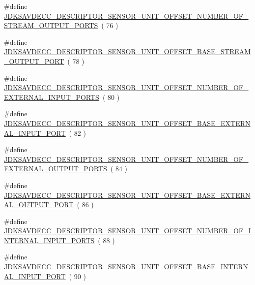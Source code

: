 \begin{DoxyCompactItemize}
\#define \hyperlink{group__descriptor__sensor_gaacec8239123a4fee756ff56fb4636e2d}{J\+D\+K\+S\+A\+V\+D\+E\+C\+C\+\_\+\+D\+E\+S\+C\+R\+I\+P\+T\+O\+R\+\_\+\+S\+E\+N\+S\+O\+R\+\_\+\+U\+N\+I\+T\+\_\+\+O\+F\+F\+S\+E\+T\+\_\+\+N\+U\+M\+B\+E\+R\+\_\+\+O\+F\+\_\+\+S\+T\+R\+E\+A\+M\+\_\+\+O\+U\+T\+P\+U\+T\+\_\+\+P\+O\+R\+TS}~( 76 )
\item 
\#define \hyperlink{group__descriptor__sensor_gafc34a74882819f2fbe133dccaed51878}{J\+D\+K\+S\+A\+V\+D\+E\+C\+C\+\_\+\+D\+E\+S\+C\+R\+I\+P\+T\+O\+R\+\_\+\+S\+E\+N\+S\+O\+R\+\_\+\+U\+N\+I\+T\+\_\+\+O\+F\+F\+S\+E\+T\+\_\+\+B\+A\+S\+E\+\_\+\+S\+T\+R\+E\+A\+M\+\_\+\+O\+U\+T\+P\+U\+T\+\_\+\+P\+O\+RT}~( 78 )
\item 
\#define \hyperlink{group__descriptor__sensor_ga317db7614f7f0baf1e04edda134b29f9}{J\+D\+K\+S\+A\+V\+D\+E\+C\+C\+\_\+\+D\+E\+S\+C\+R\+I\+P\+T\+O\+R\+\_\+\+S\+E\+N\+S\+O\+R\+\_\+\+U\+N\+I\+T\+\_\+\+O\+F\+F\+S\+E\+T\+\_\+\+N\+U\+M\+B\+E\+R\+\_\+\+O\+F\+\_\+\+E\+X\+T\+E\+R\+N\+A\+L\+\_\+\+I\+N\+P\+U\+T\+\_\+\+P\+O\+R\+TS}~( 80 )
\item 
\#define \hyperlink{group__descriptor__sensor_ga5754b8ba6c3243191fd82da170a3ebc7}{J\+D\+K\+S\+A\+V\+D\+E\+C\+C\+\_\+\+D\+E\+S\+C\+R\+I\+P\+T\+O\+R\+\_\+\+S\+E\+N\+S\+O\+R\+\_\+\+U\+N\+I\+T\+\_\+\+O\+F\+F\+S\+E\+T\+\_\+\+B\+A\+S\+E\+\_\+\+E\+X\+T\+E\+R\+N\+A\+L\+\_\+\+I\+N\+P\+U\+T\+\_\+\+P\+O\+RT}~( 82 )
\item 
\#define \hyperlink{group__descriptor__sensor_ga766142ff559ef4178d5bdfd6884bf49b}{J\+D\+K\+S\+A\+V\+D\+E\+C\+C\+\_\+\+D\+E\+S\+C\+R\+I\+P\+T\+O\+R\+\_\+\+S\+E\+N\+S\+O\+R\+\_\+\+U\+N\+I\+T\+\_\+\+O\+F\+F\+S\+E\+T\+\_\+\+N\+U\+M\+B\+E\+R\+\_\+\+O\+F\+\_\+\+E\+X\+T\+E\+R\+N\+A\+L\+\_\+\+O\+U\+T\+P\+U\+T\+\_\+\+P\+O\+R\+TS}~( 84 )
\item 
\#define \hyperlink{group__descriptor__sensor_ga32908171bc53dd4069aa60d873aa6f21}{J\+D\+K\+S\+A\+V\+D\+E\+C\+C\+\_\+\+D\+E\+S\+C\+R\+I\+P\+T\+O\+R\+\_\+\+S\+E\+N\+S\+O\+R\+\_\+\+U\+N\+I\+T\+\_\+\+O\+F\+F\+S\+E\+T\+\_\+\+B\+A\+S\+E\+\_\+\+E\+X\+T\+E\+R\+N\+A\+L\+\_\+\+O\+U\+T\+P\+U\+T\+\_\+\+P\+O\+RT}~( 86 )
\item 
\#define \hyperlink{group__descriptor__sensor_ga924bc1c8943c8cee82bef5c6ffde5929}{J\+D\+K\+S\+A\+V\+D\+E\+C\+C\+\_\+\+D\+E\+S\+C\+R\+I\+P\+T\+O\+R\+\_\+\+S\+E\+N\+S\+O\+R\+\_\+\+U\+N\+I\+T\+\_\+\+O\+F\+F\+S\+E\+T\+\_\+\+N\+U\+M\+B\+E\+R\+\_\+\+O\+F\+\_\+\+I\+N\+T\+E\+R\+N\+A\+L\+\_\+\+I\+N\+P\+U\+T\+\_\+\+P\+O\+R\+TS}~( 88 )
\item 
\#define \hyperlink{group__descriptor__sensor_ga4c46df3b11a0dfd2b3be567d1504f9f7}{J\+D\+K\+S\+A\+V\+D\+E\+C\+C\+\_\+\+D\+E\+S\+C\+R\+I\+P\+T\+O\+R\+\_\+\+S\+E\+N\+S\+O\+R\+\_\+\+U\+N\+I\+T\+\_\+\+O\+F\+F\+S\+E\+T\+\_\+\+B\+A\+S\+E\+\_\+\+I\+N\+T\+E\+R\+N\+A\+L\+\_\+\+I\+N\+P\+U\+T\+\_\+\+P\+O\+RT}~( 90 )

\end{DoxyCompactItemize}
